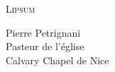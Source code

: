 
{\itshape

\lettrine{L}{ipsum} \lipsum

\begin{flushright}
Pierre Petrignani\\
Pasteur de l'église\\
Calvary Chapel de Nice
\end{flushright}

}
\closechapter[prefaceend]


